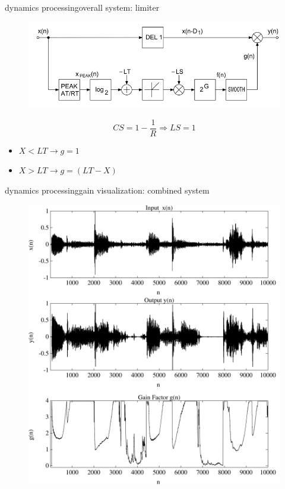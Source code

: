 \begin{frame}{dynamics processing}{overall system: limiter}
	\begin{figure}
		\centering
			\includegraphics[scale=.5]{graph/limiter}
	\end{figure}
	\begin{equation*}
		CS = 1-\frac{1}{R} \Rightarrow LS = 1
	\end{equation*}

	\pause	
	\begin{itemize}
		\item	$X<LT\rightarrow g = 1$
		\pause
		\item	$X>LT\rightarrow g = (LT-X)$
	\end{itemize}
\end{frame}

\begin{frame}{dynamics processing}{gain visualization: combined system}
	\vspace{-5mm}\begin{figure}
		\centering
			\includegraphics[scale=.25]{graph/dynamics_gain}
	\end{figure}
\end{frame}

